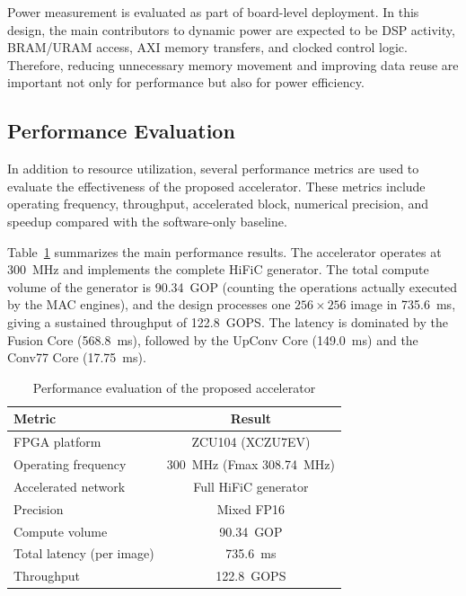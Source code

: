 Power measurement is evaluated as part of board-level deployment. In this design, the main contributors to dynamic power are expected to be DSP activity, BRAM/URAM access, AXI memory transfers, and clocked control logic. Therefore, reducing unnecessary memory movement and improving data reuse are important not only for performance but also for power efficiency.

\subsection{Performance Evaluation}

In addition to resource utilization, several performance metrics are used to evaluate the effectiveness of the proposed accelerator. These metrics include operating frequency, throughput, accelerated block, numerical precision, and speedup compared with the software-only baseline.

Table~\ref{tab:performance_evaluation} summarizes the main performance results. The accelerator operates at 300~MHz and implements the complete HiFiC generator. The total compute volume of the generator is 90.34~GOP (counting the operations actually executed by the MAC engines), and the design processes one $256\times256$ image in 735.6~ms, giving a sustained throughput of 122.8~GOPS. The latency is dominated by the Fusion Core (568.8~ms), followed by the UpConv Core (149.0~ms) and the Conv77 Core (17.75~ms).

\begin{table}[H]
    \centering
    \caption{Performance evaluation of the proposed accelerator}
    \label{tab:performance_evaluation}
    \begin{tabular}{|l|c|}
        \hline
        \textbf{Metric} & \textbf{Result} \\
        \hline
        FPGA platform & ZCU104 (XCZU7EV) \\
        \hline
        Operating frequency & 300~MHz (Fmax 308.74~MHz) \\
        \hline
        Accelerated network & Full HiFiC generator \\
        \hline
        Precision & Mixed FP16 \\
        \hline
        Compute volume & 90.34~GOP \\
        \hline
        Total latency (per image) & 735.6~ms \\
        \hline
        Throughput & 122.8~GOPS \\
        \hline
    \end{tabular}
\end{table}

